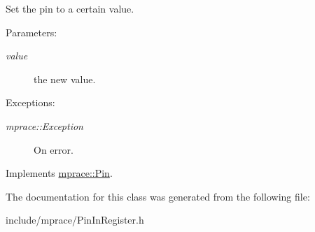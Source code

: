 Set the pin to a certain value. 

\begin{Desc}
\item[Parameters:]
\begin{description}
\item[{\em value}]the new value. \end{description}
\end{Desc}
\begin{Desc}
\item[Exceptions:]
\begin{description}
\item[{\em mprace::Exception}]On error.\end{description}
\end{Desc}


Implements \hyperlink{classmprace_1_1Pin_a1}{mprace::Pin}.

The documentation for this class was generated from the following file:\begin{CompactItemize}
\item 
include/mprace/Pin\-In\-Register.h\end{CompactItemize}
